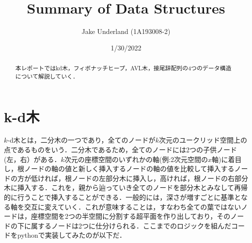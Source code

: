 \documentclass[
]{ltjarticle}
\title{Summary of Data Structures}
\author{Jake Underland (1A193008-2)}
\date{1/30/2022}
\begin{document}
\maketitle

{
\setcounter{tocdepth}{3}
\tableofcontents
}
\begin{abstract} 
本レポートではkd木，フィボナッチヒープ，AVL木，接尾辞配列の4つのデータ構造について解説していく．
\end{abstract}

\hypertarget{k-dux6728}{%
\section{k-d木}\label{k-dux6728}}

\(k\)-d木とは，二分木の一つであり，全てのノードが\(k\)次元のユークリッド空間上の点であるものをいう．二分木であるため，全てのノードには2つの子供ノード(左，右）がある．\(k\)次元の座標空間のいずれかの軸(例:2次元空間の\(x\)軸)に着目し，根ノードの軸の値と新しく挿入するノードの軸の値を比較して挿入するノードの方が低ければ，根ノードの左部分木に挿入し，高ければ，根ノードの右部分木に挿入する．これを，親から辿っていき全てのノードを部分木とみなして再帰的に行うことで挿入することができる．一般的には，深さが増すごとに基準となる軸を交互に変えていく．これが意味することは，すなわち全ての葉ではないノードは，座標空間を2つの半空間に分割する超平面を作り出しており，そのノードの下に属するノードは2つに仕分けられる．ここまでのロジックを組んだコードをpythonで実装してみたのが以下だ．
\end{document}
